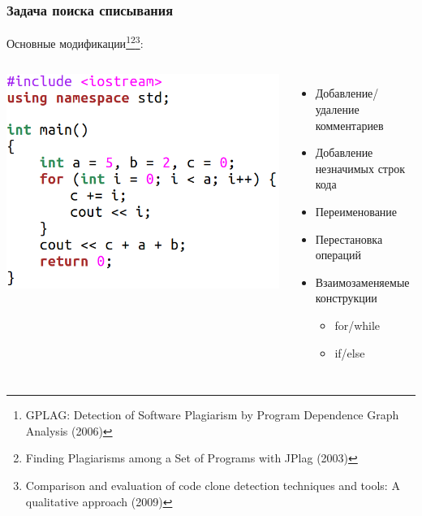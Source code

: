 \documentclass[10pt]{beamer}
\begin{document}
\begin{frame}\frametitle{Задача поиска списывания}
		\hspace{-0.5cm}
Основные модификации\footnote[frame]{GPLAG: Detection of Software Plagiarism by Program Dependence Graph Analysis (2006)}\footnote[frame]{Finding Plagiarisms among a Set of Programs with JPlag (2003)}\footnote[frame]{Comparison and evaluation of code clone detection techniques and tools: A qualitative approach (2009)}:
\begin{columns}
  \centering
  \includegraphics[scale=0.7]{clear.png}
  
  \centering
  \begin{itemize}
  	\item Добавление/удаление комментариев
  	\item Добавление незначимых строк кода
  	\item Переименование
  	\item Перестановка операций
  	\item Взаимозаменяемые конструкции
  	\begin{itemize}
  		\item for/while
  		\item if/else
  	\end{itemize}
  \end{itemize}
\end{columns}
\end{frame}
\end{document}
